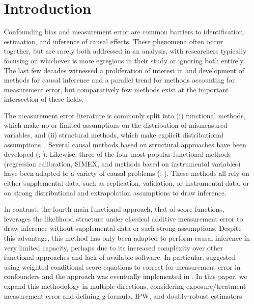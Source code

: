 \documentclass[useAMS,usenatbib,referee]{biom}
\begin{document}
%

\section{Introduction}
\label{s:intro}

Confounding bias and measurement error are common barriers to identification, estimation, and inference of causal effects. These phenomena often occur together, but are rarely both addressed in an analysis, with researchers typically focusing on whichever is more egregious in their study or ignoring both entirely. The last few decades witnessed a proliferation of interest in and development of methods for causal inference and a parallel trend for methods accounting for measurement error, but comparatively few methods exist at the important intersection of these fields.

The measurement error literature is commonly split into (i) functional methods, which make no or limited assumptions on the distribution of mismeasured variables, and (ii) structural methods, which make explicit distributional assumptions~\citep{carroll2006}. Several causal methods based on structural approaches have been developed (\citealp{kuroki2014,edwards2015multiple,braun2017}; \citealp*{hong2017}). Likewise, three of the four most popular functional methods (regression calibration, SIMEX, and methods based on instrumental variables) have been adapted to a variety of causal problems (\citealp*{vansteelandt2009}; \citealp{cole2010,kendall2015,lockwood2015,kyle2016,wu2019}). These methods all rely on either supplemental data, such as replication, validation, or instrumental data, or on strong distributional and extrapolation assumptions to draw inference.

In contrast, the fourth main functional approach, that of score functions, leverages the likelihood structure under classical additive measurement error to draw inference without supplemental data or such strong assumptions. Despite this advantage, this method has only been adapted to perform causal inference in very limited capacity, perhaps due to its increased complexity over other functional approaches and lack of available software. In particular, \citet*{mccaffrey2013} suggested using weighted conditional score equations to correct for measurement error in confounders and the approach was eventually implemented in \citet{shu2019}. In this paper, we expand this methodology in multiple directions, considering exposure/treatment measurement error and defining g-formula, IPW, and doubly-robust estimators.
\end{document}
